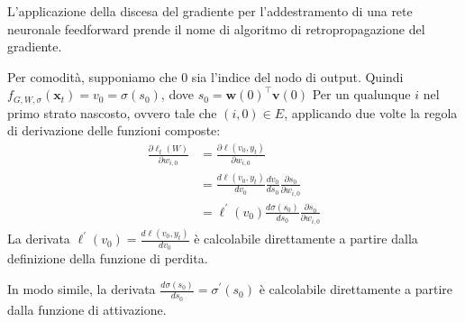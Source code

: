 \documentclass[\main/main.tex]{subfiles}
\begin{document}
\begin{definition}
    \begin{multicols}{2}
        L'applicazione della discesa del gradiente per l'addestramento di una rete neuronale feedforward prende il nome di algoritmo di retropropagazione del gradiente.
        
        Per comodità, supponiamo che \(0\) sia l'indice del nodo di output. Quindi \(f_{G, W, \sigma}\left(\boldsymbol{x}_{t}\right)=v_{0}=\sigma\left(s_{0}\right)\), dove \(s_{0}=\boldsymbol{w}(0)^{\top} \boldsymbol{v}(0)\) Per un qualunque \(i\) nel primo strato nascosto, ovvero tale che \((i, 0) \in E\), applicando due volte la regola di derivazione delle funzioni composte:
        \begin{align*}
            \frac{\partial \ell_{t}(W)}{\partial w_{i, 0}}&=\frac{\partial \ell\left(v_{0}, y_{t}\right)}{\partial w_{i, 0}}\\&=\frac{d \ell\left(v_{0}, y_{t}\right)}{d v_{0}} \frac{d v_{0}}{d s_{0}} \frac{\partial s_{0}}{\partial w_{i, 0}}\\&=\ell^{\prime}\left(v_{0}\right) \frac{d \sigma\left(s_{0}\right)}{d s_{0}} \frac{\partial s_{0}}{\partial w_{i, 0}}
        \end{align*}
        La derivata \(\ell^{\prime}\left(v_{0}\right)=\frac{d \ell\left(v_{0}, y_{t}\right)}{d v_{0}}\) è calcolabile direttamente a partire dalla definizione della funzione di perdita.
        
        In modo simile, la derivata \(\frac{d \sigma\left(s_{0}\right)}{d s_{0}}=\sigma^{\prime}\left(s_{0}\right)\) è calcolabile direttamente a partire dalla funzione di attivazione.
        

\end{multicols}
\end{definition}
\end{document}
